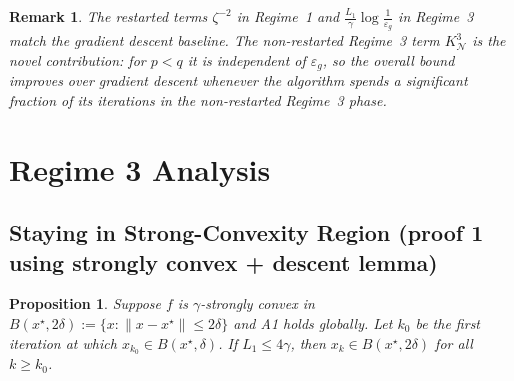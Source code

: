 \documentclass{article}
\newtheorem{proposition}{Proposition}
\newtheorem{remark}{Remark}
\begin{document}
\begin{remark}
The restarted terms $\zeta^{-2}$ in Regime~1 and
$\frac{L_1}{\gamma}\log\frac{1}{\varepsilon_g}$ in Regime~3
match the gradient descent baseline. The non-restarted Regime~3
term $K^3_{\mathcal{N}}$ is the novel contribution: for $p<q$ it
is independent of $\varepsilon_g$, so the overall bound improves
over gradient descent whenever the algorithm spends a significant
fraction of its iterations in the non-restarted Regime~3 phase.
\end{remark}

\section{Regime 3 Analysis}
\label{sec:regime3stay}

\subsection{Staying in Strong-Convexity Region (proof 1 using strongly convex + descent lemma)}
\label{subsubsec:staying}

\begin{proposition}
\label{prop:stay}
Suppose $f$ is $\gamma$-strongly convex in $B(x^\star, 2\delta) := \{x : \|x - x^\star\| \leq 2\delta\}$ and A1 holds globally. Let $k_0$ be the first iteration at which $x_{k_0} \in B(x^\star, \delta)$. If $L_1 \leq 4\gamma$, then $x_k \in B(x^\star, 2\delta)$ for all $k \geq k_0$.
\end{proposition}
\end{document}
